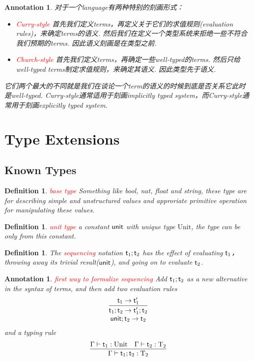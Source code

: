 \documentclass{article}
\theoremstyle{plain}
\newtheorem{definition}[theorem]{Definition}
\newtheorem{annotation}[theorem]{Annotation}
\theoremstyle{nonumberplain}
\newcommand{\singletype}[1]{\text{#1}}
\newcommand{\termtype}[2]{\ensuremath{#1:#2}}
\newcommand{\term}[1]{\ensuremath\mathsf{#1}}
\newcommand{\seq}[2]{#1;#2}
\newcommand{\redt}[1]{\textcolor{red}{#1}}
\begin{document}
\begin{annotation}
\rm 对于一个language有两种特别的刻画形式：
\begin{itemize}
	\item \redt{Curry-style} 首先我们定义terms，再定义关于它们的求值规则(evaluation rules)，来确定terms的语义. 然后我们在定义一个类型系统来拒绝一些不符合我们预期的terms. 因此语义刻画是在类型之前.
	\item \redt{Church-style} 首先我们定义terms，再确定一些well-typed的terms. 然后只给well-typed terms制定求值规则，来确定其语义. 因此类型先于语义. 
\end{itemize}
它们两个最大的不同就是我们在谈论一个term的语义的时候到底是否关系它此时是well-typed. Curry-style通常适用于刻画implicitly typed system，而Curry-style通常用于刻画explicitly typed system. 
\end{annotation}

\section{Type Extensions}

\subsection{Known Types}

\begin{definition}
\rm \redt{base type} Something like bool, nat, float and string, these type are for describing simple and unstructured values and approriate primitive operation for manipulating these values.
\end{definition}

\begin{definition}
\rm \redt{unit type} a constant $\term{unit}$ with unique type $\singletype{Unit}$, the type can be only from this constant.  
\end{definition}

\begin{definition}
\rm The \redt{sequencing} notation $\seq{\term{t}_1}{\term{t}_2}$ has the effect of evaluating $\term{t}_1$，throwing away its trivial result($\term{unit}$), and going on to evaluate $\term{t}_2$. 
\end{definition}

\begin{annotation}
\rm \redt{ first way to formalize sequencing} Add $\seq{\term{t}_1}{\term{t}_2}$ as a new alternative in the syntax of terms, and then add two evaluation rules
$$
\begin{array}{cc}
\infer{\seq{\term{t}_1}{\term{t}_2} \to \seq{\term{t}_1'}{\term{t}_2}}{\term{t}_1 \to \term{t}_1'} \\
\seq{\term{unit}}{\term{t}_2} \to \term{t}_2 
\end{array}
$$
and a typing rule
$$
\infer{\Gamma \vdash \termtype{\seq{\term{t}_1}{\term{t}_2}}{\singletype{T}_2}}{\Gamma \vdash \termtype{\term{t}_1}{\singletype{Unit}} & \Gamma \vdash \termtype{\term{t}_2}{\singletype{T}_2}}
$$
\end{annotation}
\end{document}
